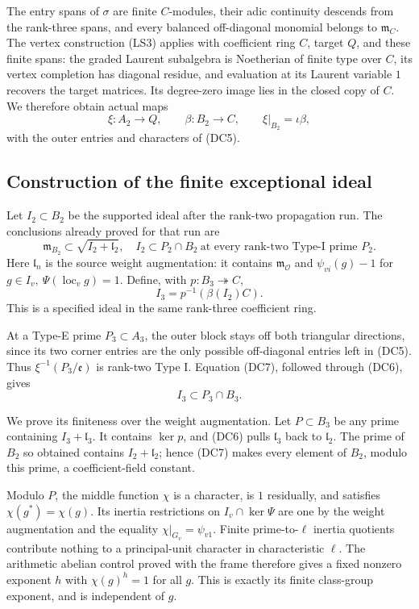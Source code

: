The entry spans of \(\sigma\) are finite
\(C\)-modules, their adic continuity descends
from the rank-three spans, and every balanced
off-diagonal monomial belongs to
\(\mathfrak m_C\).
The vertex construction (LS3) applies with
coefficient ring \(C\), target \(Q\), and these
finite spans: the graded Laurent subalgebra
is Noetherian of finite type over \(C\), its
vertex completion has diagonal residue, and
evaluation at its Laurent variable \(1\)
recovers the target matrices.
Its degree-zero image lies in the closed
copy of \(C\).
We therefore obtain actual maps
\[
           \xi:A_2\longrightarrow Q,\qquad
             \beta:B_2\longrightarrow C,\qquad
      \xi|_{B_2}=\iota\beta,                                 \tag{DC6}
\]
with the outer entries and characters of
(DC5).

\subsection{Construction of the finite exceptional ideal}
Let \(I_2\subset B_2\) be the supported ideal
after the rank-two propagation run.
The conclusions already proved for that run
are
\[
 \mathfrak m_{B_2}\subset
               \sqrt{I_2+\mathfrak l_2},
 \quad
 I_2\subset P_2\cap B_2
           \ \text{at every rank-two Type-I prime }P_2.       \tag{DC7}
\]
Here \(\mathfrak l_n\) is the source weight
augmentation: it contains
\(\mathfrak m_{\mathcal O}\) and
\(\psi_{vi}(g)-1\) for
\(g\in I_v,\ \Psi(\operatorname{loc}_v g)=1\).
Define, with \(p:B_3\twoheadrightarrow C\),
\[
                         I_3=p^{-1}(\beta(I_2)C).             \tag{DC8}
\]
This is a specified ideal in the same
rank-three coefficient ring.

At a Type-E prime \(P_3\subset A_3\), the
outer block stays off both triangular
directions, since its two corner entries
are the only possible off-diagonal entries
left in (DC5).
Thus \(\xi^{-1}(P_3/\mathfrak e)\) is
rank-two Type I.
Equation (DC7), followed through (DC6),
gives
\[
                           I_3\subset P_3\cap B_3.            \tag{DC9}
\]

We prove its finiteness over the weight
augmentation.
Let \(P\subset B_3\) be any prime containing
\(I_3+\mathfrak l_3\).
It contains \(\ker p\), and (DC6) pulls
\(\mathfrak l_3\) back to
\(\mathfrak l_2\).
The prime of \(B_2\) so obtained contains
\(I_2+\mathfrak l_2\); hence (DC7) makes
every element of \(B_2\), modulo this
prime, a coefficient-field constant.

Modulo \(P\), the middle function \(\chi\)
is a character, is \(1\) residually, and
satisfies \(\chi(g^*)=\chi(g)\).
Its inertia restrictions on
\(I_v\cap\ker\Psi\) are one by the weight
augmentation and the equality
\(\chi|_{G_v}=\psi_{v1}\).
Finite prime-to-\(\ell\) inertia quotients
contribute nothing to a principal-unit
character in characteristic \(\ell\).
The arithmetic abelian control proved
with the frame therefore gives a fixed
nonzero exponent \(h\) with
\(\chi(g)^h=1\) for all \(g\).
This is exactly its finite class-group
exponent, and is independent of \(g\).


